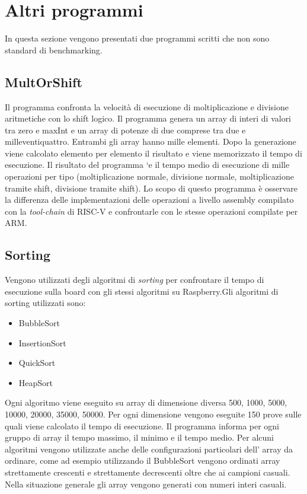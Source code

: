\documentclass[12pt,a4paper]{report}
\begin{document}

\chapter{Altri programmi} 
In questa sezione vengono presentati due programmi scritti che non sono standard di benchmarking. 

\section{MultOrShift}
	Il programma confronta la velocità di esecuzione di moltiplicazione e divisione
aritmetiche con lo shift logico. Il programma genera un array di interi di
valori tra zero e maxInt e un array di potenze di due comprese tra due e
milleventiquattro. Entrambi gli array hanno mille elementi. Dopo la generazione
viene calcolato elemento per elemento il risultato e viene memorizzato il
tempo di esecuzione. Il risultato del programma `e il tempo medio di esecuzione
di mille operazioni per tipo (moltiplicazione normale, divisione normale,
moltiplicazione tramite shift, divisione tramite shift). 
Lo scopo di questo programma è osservare la differenza delle implementazioni delle operazioni a livello assembly compilato con la \textit{tool-chain} di RISC-V e confrontarle con le stesse operazioni compilate per ARM.
		
		
\section{Sorting}
Vengono utilizzati degli algoritmi di \textit{sorting} per confrontare il tempo di esecuzione sulla board con gli stessi algoritmi su Raspberry.Gli algoritmi di sorting utilizzati sono:
\begin{itemize}
	\item BubbleSort
	\item InsertionSort
	\item QuickSort
	\item HeapSort
\end{itemize}

Ogni algoritmo viene eseguito su array di dimensione diversa 500, 1000, 5000, 10000, 20000, 35000, 50000. Per ogni dimensione vengono eseguite 150 prove sulle quali viene calcolato il tempo di esecuzione. Il programma informa per ogni gruppo di array il tempo massimo, il minimo e il tempo medio. Per alcuni algoritmi vengono utilizzate anche delle configurazioni particolari dell' array da ordinare, come ad esempio utilizzando il BubbleSort vengono ordinati array strettamente crescenti e strettamente decrescenti oltre che ai campioni casuali. Nella situazione generale gli array vengono generati con numeri interi casuali.
\end{document}
